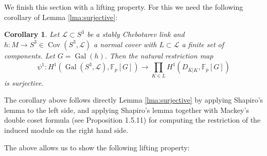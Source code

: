 \documentclass{amsart}
\theoremstyle{plain}
\theoremstyle{definition}
\theoremstyle{plain}
\theoremstyle{plain}
\newtheorem{corollary}[theorem]{Corollary}
\theoremstyle{plain}
\theoremstyle{remark}
\theoremstyle{remark}
\theoremstyle{plain}
\theoremstyle{definition}
\theoremstyle{plain}
\DeclareMathOperator{\Gal}{\mathrm{Gal}}
\DeclareMathOperator{\Cov}{\mathrm{Cov}}
\theoremstyle{plain}
\theoremstyle{plain}
\numberwithin{equation}{section}
\begin{document}
We finish this section with a lifting property. For this we need the following corollary of Lemma \ref{lma:surjective}:

\begin{corollary}\label{cor:nsw924}
Let $\mathcal{L} \subset S^3$ be a stably Chebotarev link and $h: M \to S^3 \in \Cov(S^3, \mathcal{L})$ a normal cover with $L \subset \mathcal{L}$ a finite set of components. Let $G = \Gal(h)$. Then the natural restriction map
\begin{equation}
    \psi^1: H^1(\Gal(S^3, \mathcal{L}), \mathbb{F}_p[G]) \to \prod_{K \in L} H^1(D_{\overline{K}|K}, \mathbb{F}_p[G])
\end{equation}
is surjective.
\end{corollary}

The corollary above follows directly Lemma \ref{lma:surjective} by applying Shapiro's lemma to the left side, and applying Shapiro's lemma together with Mackey's double coset formula (see \cite{neukirch2013cohomology} Proposition 1.5.11) for computing the restriction of the induced module on the right hand side.

\medskip

The above allows us to show the following lifting property:
\end{document}
